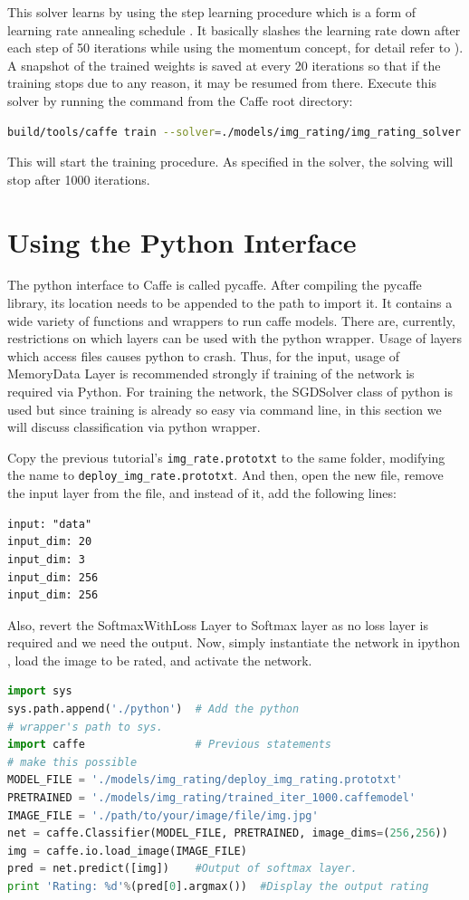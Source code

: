 \documentclass{article}
\begin{document}
This solver learns by using the step learning procedure which is a form of learning rate annealing schedule \cite{Haykin:nn}. It basically slashes the learning rate down after each step of 50 iterations while using the momentum concept, for detail refer to \cite{Haykin:nn}). A snapshot of the trained weights is saved at every 20 iterations so that if the training stops due to any reason, it may be resumed from there. Execute this solver by running the command from the Caffe root directory:
\begin{lstlisting}[tabsize=4,language=bash,breaklines]
build/tools/caffe train --solver=./models/img_rating/img_rating_solver.prototxt --gpu=0
\end{lstlisting}

This will start the training procedure. As specified in the solver, the solving will stop after 1000 iterations. 

\section{Using the Python Interface}
The python interface to Caffe is called pycaffe. After compiling the pycaffe library, its location needs to be appended to the path to import it. It contains a wide variety of functions and wrappers to run caffe models. There are, currently, restrictions on which layers can be used with the python wrapper. Usage of layers which access files causes python to crash. Thus, for the input, usage of MemoryData Layer is recommended strongly if training of the network is required via Python. For training the network, the SGDSolver class of python is used but since training is already so easy via command line, in this section we will discuss classification via python wrapper. 
\par
Copy the previous tutorial's \verb|img_rate.prototxt| to the same folder, modifying the name to \verb|deploy_img_rate.prototxt|. And then, open the new file, remove the input layer from the file, and instead of it, add the following lines:
\begin{lstlisting}[tabsize=2,breaklines=true]
input: "data"
input_dim: 20
input_dim: 3
input_dim: 256
input_dim: 256
\end{lstlisting}
Also, revert the SoftmaxWithLoss Layer to Softmax layer as no loss layer is required and we need the output. Now, simply instantiate the network in ipython \cite{ipython}, load the image to be rated, and activate the network.

\begin{lstlisting}[language=Python,breaklines,showstringspaces=false]
import sys
sys.path.append('./python')  # Add the python 
# wrapper's path to sys.
import caffe                 # Previous statements 
# make this possible
MODEL_FILE = './models/img_rating/deploy_img_rating.prototxt'
PRETRAINED = './models/img_rating/trained_iter_1000.caffemodel'
IMAGE_FILE = './path/to/your/image/file/img.jpg'
net = caffe.Classifier(MODEL_FILE, PRETRAINED, image_dims=(256,256))
img = caffe.io.load_image(IMAGE_FILE)
pred = net.predict([img])    #Output of softmax layer.
print 'Rating: %d'%(pred[0].argmax())  #Display the output rating
\end{lstlisting}
\end{document}
